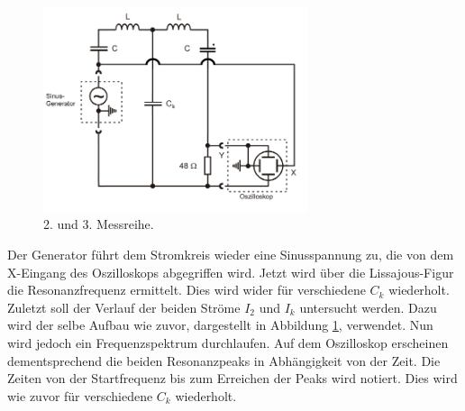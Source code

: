 \begin{figure}[H]
  \centering
  \includegraphics[height=6cm]{b.png}
  \caption{2. und 3. Messreihe.}
  \label{fig:5}
\end{figure}

Der Generator führt dem Stromkreis wieder eine Sinusspannung zu, die von dem X-Eingang des Oszilloskops abgegriffen wird.
Jetzt wird über die Lissajous-Figur die Resonanzfrequenz ermittelt.
Dies wird wider für verschiedene $C_k$ wiederholt.\\
Zuletzt soll der Verlauf der beiden Ströme $I_2$ und $I_k$ untersucht werden.
Dazu wird der selbe Aufbau wie zuvor, dargestellt in Abbildung \ref{fig:5}, verwendet.
Nun wird jedoch ein Frequenzspektrum durchlaufen.
Auf dem Oszilloskop erscheinen dementsprechend die beiden Resonanzpeaks in Abhängigkeit von der Zeit.
Die Zeiten von der Startfrequenz bis zum Erreichen der Peaks wird notiert.
Dies wird wie zuvor für verschiedene $C_k$ wiederholt.
